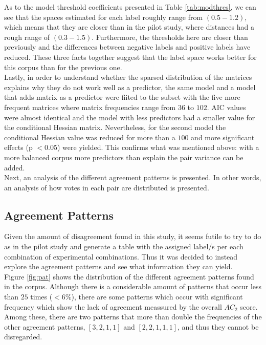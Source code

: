 As to the model threshold coefficients presented in Table \ref{tab:modthres}, we can see that the spaces estimated for each label roughly range from $(0.5-1.2)$, which means that they are closer than in the pilot study, where distances had a rough range of $(0.3-1.5)$. Furthermore, the thresholds here are closer than previously and the differences between negative labels and positive labels have reduced. These three facts together suggest that the label space works better for this corpus than for the previous one.\\

Lastly, in order to understand whether the sparsed distribution of the matrices explains why they do not work well as a predictor, the same model and a model that adds matrix as a predictor were fiited to the subset with the five more frequent matrices where matrix frequencies range from $36$ to $102$. AIC values were almost identical and the model with less predictors had a smaller value for the conditional Hessian matrix. Nevertheless, for the second model the conditional Hessian value was reduced for more than a $100$ and more significant effects (p $<0.05$) were yielded. This confirms what was mentioned above: with a more balanced corpus more predictors than explain the pair variance can be added.\\

Next, an analysis of the different agreement patterns is presented. In other words, an analysis of how votes in each pair are distributed is presented.\\

\subsection{Agreement Patterns}\label{subsect:agrepat}

Given the amount of disagreement found in this study, it seems futile to try to do as in the pilot study and generate a table with the assigned label/s per each combination of experimental combinations. Thus it was decided to instead explore the agreement patterns and see what information they can yield.\\

Figure \ref{fig:pat} shows the distribution of the different agreement patterns found in the corpus. Although there is a considerable amount of patterns that occur less than $25$ times ($<6\%$), there are some patterns which occur with significant frequency which show the lack of agreement meassured by the overall $AC_2$ score. Among these, there are two patterns that more than double the frequencies of the other agreement patterns, $[3,2,1,1]$ and $[2,2,1,1,1]$, and thus they cannot be disregarded.\\

